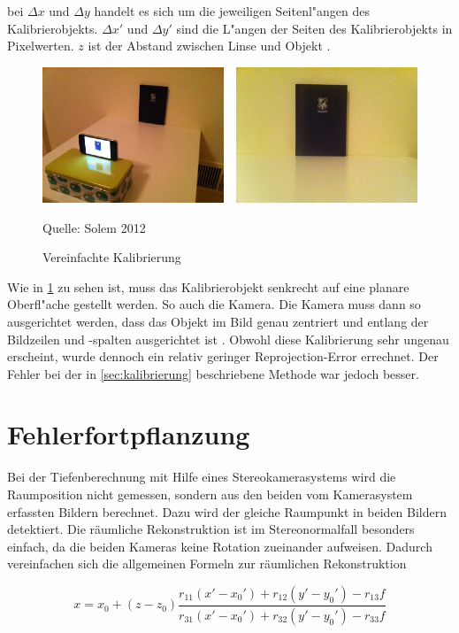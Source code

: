\noindent bei $\Delta x$ und $\Delta y$ handelt es sich um die jeweiligen Seitenl"angen des Kalibrierobjekts.\newline
$\Delta x'$ und $\Delta y'$ sind die L"angen der Seiten des Kalibrierobjekts in Pixelwerten. $z$ ist der Abstand zwischen Linse und Objekt \cite{PCV} \cite{CVF}.

\begin{figure}[H]
	\includegraphics[scale=1.0]{bilder/simple_calib}
	\caption[Vereinfachte Kalibrierung]{Vereinfachte Kalibrierung}
	\small Quelle: Solem 2012
	\label{fig:simplecalib}%
\end{figure}

\noindent Wie in \ref{fig:simplecalib} zu sehen ist, muss das Kalibrierobjekt senkrecht auf eine planare Oberfl"ache gestellt werden. So auch die Kamera. Die Kamera muss dann so ausgerichtet werden, dass das Objekt im Bild genau zentriert und entlang der Bildzeilen und -spalten ausgerichtet ist \cite{CVF}.\newline
Obwohl diese Kalibrierung sehr ungenau erscheint, wurde dennoch ein relativ geringer Reprojection-Error errechnet. Der Fehler bei der in \ref{sec:kalibrierung} beschriebene Methode war jedoch besser.

\section{Fehlerfortpflanzung}
\label{sec:fehlerfortpflanzungtiefen}

Bei der Tiefenberechnung mit Hilfe eines Stereokamerasystems wird die Raumposition nicht gemessen, sondern aus den beiden vom Kamerasystem erfassten Bildern berechnet. Dazu wird der gleiche Raumpunkt in beiden Bildern detektiert. Die räumliche Rekonstruktion ist im Stereonormalfall besonders einfach, da die beiden Kameras keine Rotation zueinander aufweisen. Dadurch vereinfachen sich die allgemeinen Formeln zur räumlichen Rekonstruktion \cite{frz}

\begin{equation}
x = x_{0} + (z - z_{0})\frac
{r_{11}(x'-x_{0}') + r_{12}(y'-y_{0}')-r_{13}f}
{r_{31}(x'-x_{0}') + r_{32}(y'-y_{0}')-r_{33}f}
\end{equation}

